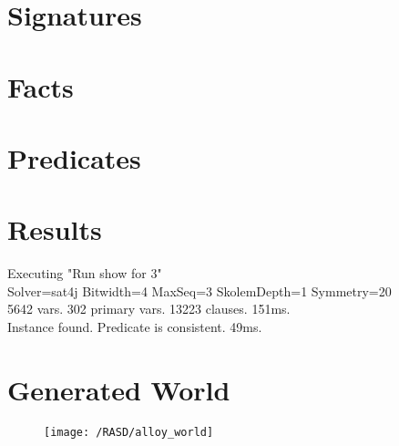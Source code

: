 
\section{Signatures}
	
\section{Facts}
	
\section{Predicates}
	
\section{Results}
Executing "Run show for 3" \\
Solver=sat4j Bitwidth=4 MaxSeq=3 SkolemDepth=1 Symmetry=20 \\
5642 vars. 302 primary vars. 13223 clauses. 151ms. \\
Instance found. Predicate is consistent. 49ms. \\

\newpage
\section{Generated World}
\begin{figure}[!ht]
  \centering
  \vspace{0.2cm}
  \texttt{[image: /RASD/alloy\_world]}\\
  \vspace{0.2cm}
  \label{fig:alloy_world} 
\end{figure}
